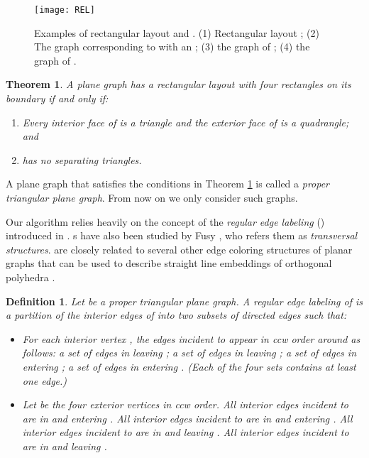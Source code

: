 \documentclass[11pt]{article}
\newtheorem{theorem}[figure]{Theorem}
\newtheorem{definition}[figure]{Definition}
\begin{document}
\begin{figure}[t]
\begin{center}
\texttt{[image: REL]}
  \centering
\caption{Examples of rectangular layout and . (1) Rectangular
layout ; (2) The graph corresponding to  with
an  ; (3) the graph  of ; (4) the
graph  of .}
\label{fig:REL}
\end{center}
\end{figure}

\begin{theorem}\label{thm:proper} \cite{KK85}
A plane graph  has a rectangular layout  with
four rectangles on its boundary if and only if:
\begin{enumerate}
\item Every interior face of  is a triangle and the exterior face
of  is a quadrangle; and \item  has no separating triangles.
\end{enumerate}
\end{theorem}

A plane graph that satisfies the conditions in Theorem \ref{thm:proper}
is called a {\em proper triangular plane graph}. From now on we
only consider such graphs.

Our algorithm relies heavily on the concept of the \emph{regular edge
labeling} () introduced in . s have also been
studied by Fusy \cite{Fu06,Fu09}, who refers them as {\em transversal
structures}.  are closely related to several other edge
coloring structures of planar graphs that can be used to describe
straight line embeddings of orthogonal polyhedra \cite{Ep10,EM10}.

\begin{definition}\label{def:REL}
Let  be a proper triangular plane graph.
A regular edge labeling   of
 is a partition of the interior edges of  into two
subsets  of directed edges such that:

\begin{itemize}
\item For each interior vertex , the edges incident to 
appear in ccw order around  as follows: a set of
edges in  leaving ; a set of edges in  leaving ;
a set of edges in  entering ; a set of edges in  entering .
(Each of the four sets contains at least one edge.)

\item Let  be the four exterior vertices in
ccw order. All interior edges incident to  are
in  and entering . All interior edges incident to
 are in  and entering . All interior edges incident
to  are in  and leaving . All interior edges
incident to  are in  and leaving .
\end{itemize}
\end{definition}
\end{document}
